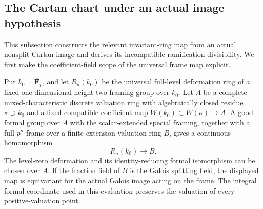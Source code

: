 \subsection{The Cartan chart under an actual image hypothesis}
\label{sec:boundary-nonsplit-image-proof}

This subsection constructs the relevant invariant-ring map from
an actual nonsplit-Cartan image and derives its incompatible
ramification divisibility. We first make the coefficient-field
scope of the universal frame map explicit.

\begin{lemma}
\label{lem:scalar-compatible-frame}
Put $k_0=\overline{\mathbf F}_p$, and let $R_n(k_0)$ be the universal
full-level deformation ring of a fixed one-dimensional height-two
framing group over $k_0$. Let $A$ be a complete mixed-characteristic
discrete valuation ring with algebraically closed residue
$\kappa\supset k_0$ and a fixed compatible coefficient map
$W(k_0)\subset W(\kappa)\to A$.
A good formal group over $A$ with the scalar-extended special
framing, together with a full $p^n$-frame over a finite extension
valuation ring $B$, gives a continuous homomorphism
\[
                           R_n(k_0)\longrightarrow B.
\]
The level-zero deformation and its identity-reducing formal
isomorphism can be chosen over $A$. If the fraction field of $B$
is the Galois splitting field, the displayed map is equivariant
for the actual Galois image acting on the frame. The integral
formal coordinate used in this evaluation preserves the valuation
of every positive-valuation point.
\end{lemma}

